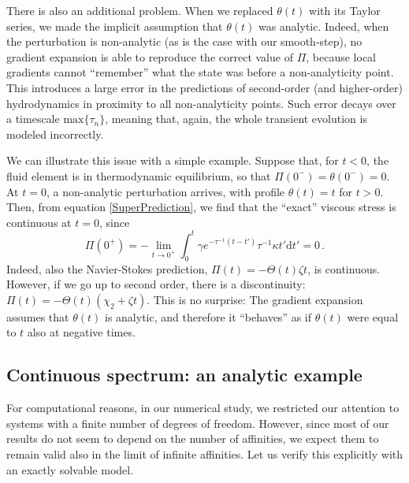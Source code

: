 \documentclass[a4paper, amsfonts, amssymb, amsmath, reprint, showkeys, nofootinbib, twoside, onecolumn,notitlepage]{revtex4-2}
\renewcommand{\d}{\mathrm{d}}
\begin{document}
There is also an additional problem. When we replaced $\theta(t)$ with its Taylor series, we made the implicit assumption that $\theta(t)$ was analytic. Indeed, when the perturbation is non-analytic (as is the case with our smooth-step), no gradient expansion is able to reproduce the correct value of $\Pi$, because local gradients cannot ``remember'' what the state was before a non-analyticity point. This introduces a large error in the predictions of second-order (and higher-order) hydrodynamics in proximity to all non-analyticity points. Such error decays over a timescale $\text{max}\{\tau_n\}$, meaning that, again, the whole transient evolution is modeled incorrectly. 

We can illustrate this issue with a simple example. Suppose that, for $t<0$, the fluid element is in thermodynamic equilibrium, so that $\Pi(0^-)=\theta(0^-)=0$. At $t=0$, a non-analytic perturbation arrives, with profile $\theta(t)=t$ for $t>0$. Then, from equation \eqref{SuperPrediction}, we find that the ``exact'' viscous stress is continuous at $t=0$, since
\begin{equation}
\Pi(0^+)={-} \lim_{t \rightarrow 0^+}\int_{0}^t \gamma e^{-\tau^{-1}(t-t')} \tau^{-1}\kappa t'\d t' =0 \, .
\end{equation}
Indeed, also the Navier-Stokes prediction, $\Pi(t)=- \Theta(t)\zeta t$, is continuous. However, if we go up to second order, there is a discontinuity: $\Pi(t)=-\Theta(t)(\chi_2+\zeta t)$. This is no surprise: The gradient expansion assumes that $\theta(t)$ is analytic, and therefore it ``behaves'' as if $\theta(t)$ were equal to $t$ also at negative times.



\subsection{Continuous spectrum: an analytic example}

For computational reasons, in our numerical study, we restricted our attention to systems with a finite number of degrees of freedom. However, since most of our results do not seem to depend on the number of affinities, we expect them to remain valid also in the limit of infinite affinities. Let us verify this explicitly with an exactly solvable model. 
\end{document}
